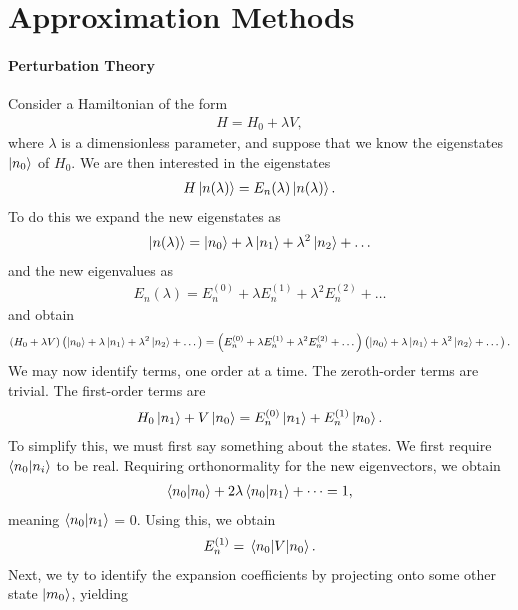 \section{Approximation Methods}

\paragraph{Perturbation Theory}
Consider a Hamiltonian of the form
\begin{align*}
	H = H_{0} + \lambda V,
\end{align*}
where $\lambda$ is a dimensionless parameter, and suppose that we know the eigenstates $\ket{n_{0}}$ of $H_{0}$. We are then interested in the eigenstates
\begin{align*}
	H\ket{n(\lambda)} = E_{n}(\lambda)\ket{n(\lambda)}.
\end{align*}
To do this we expand the new eigenstates as
\begin{align*}
	\ket{n(\lambda)} = \ket{n_{0}} + \lambda\ket{n_{1}} + \lambda^{2}\ket{n_{2}} + \dots
\end{align*}
and the new eigenvalues as
\begin{align*}
	E_{n}(\lambda) = E_{n}^{(0)} + \lambda E_{n}^{(1)} + \lambda^{2}E_{n}^{(2)} + \dots
\end{align*}
and obtain
\begin{align*}
	(H_{0} + \lambda V)\left(\ket{n_{0}} + \lambda\ket{n_{1}} + \lambda^{2}\ket{n_{2}} + \dots\right) = \left(E_{n}^{(0)} + \lambda E_{n}^{(1)} + \lambda^{2}E_{n}^{(2)} + \dots\right)\left(\ket{n_{0}} + \lambda\ket{n_{1}} + \lambda^{2}\ket{n_{2}} + \dots\right).
\end{align*}
We may now identify terms, one order at a time. The zeroth-order terms are trivial. The first-order terms are
\begin{align*}
	H_{0}\ket{n_{1}} + V\ket{n_{0}} = E_{n}^{(0)}\ket{n_{1}} + E_{n}^{(1)}\ket{n_{0}}.
\end{align*}
To simplify this, we must first say something about the states. We first require $\braket{n_{0}}{n_{i}}$ to be real. Requiring orthonormality for the new eigenvectors, we obtain
\begin{align*}
	\braket{n_{0}} + 2\lambda\braket{n_{0}}{n_{1}} + \dots = 1,
\end{align*}
meaning $\braket{n_{0}}{n_{1}}$ = 0. Using this, we obtain
\begin{align*}
	E_{n}^{(1)} = \expval{V}{n_{0}}.
\end{align*}
Next, we ty to identify the expansion coefficients by projecting onto some other state $\ket{m_{0}}$, yielding
